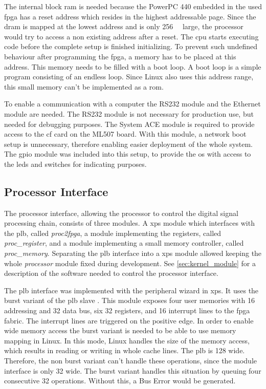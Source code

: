 \documentclass[12pt,a4paper,parskip=full,abstract=true,BCOR=12mm,twoside,open=right]{scrreprt}
\def\device#1{\mbox{\textit{#1}}}
\begin{document}
The internal block \gls{ram} is needed because the PowerPC 440 embedded
in the used \gls{fpga} has a reset address which resides in the highest
addressable page\cite{ppc}. Since the \gls{dram} is mapped at the lowest address
and is only \SI{256}{\mebi\byte} large\cite{ml507}, the processor would try to access
a non existing address after a reset. The \gls{cpu} starts
executing code before the complete setup is finished initializing. To prevent such undefined
behaviour after programming the \gls{fpga}, a memory has to be placed at
this address. This memory needs to be filled with a boot loop. A boot
loop is a simple program consisting of an endless loop. Since Linux
also uses this address range, this small memory can't be implemented
as a \gls{rom}.

To enable a communication with a computer the RS232 module and the Ethernet
module are needed. The RS232 module is not necessary for production use,
but needed for debugging purposes. The System ACE module is required to
provide access to the \gls{cf} card on the ML507 board. With this module,
a network boot setup is unnecessary, therefore enabling easier deployment
of the whole system. The \gls{gpio} module was included into this setup,
to provide the \gls{os} with access to the \glspl{led} and switches for
indicating purposes.


\subsection{Processor Interface}
\label{sec:processor_interface}

The processor interface, allowing the processor to control the digital
signal processing chain, consists of three modules. A \gls{xps} module which
interfaces with the \gls{plb}, called \device{proc2fpga}, a module
implementing the registers, called \device{proc\_register}, and a module
implementing a small memory controller, called \device{proc\_memory}. Separating
the \gls{plb} interface into a \gls{xps} module allowed keeping the whole
\device{processor} module fixed during development. See \cref{sec:kernel_module}
for a description of the software needed to control the processor interface.

The \gls{plb} interface was implemented with the peripheral wizard in \gls{xps}.
It uses the burst variant of the \gls{plb} slave \cite{slave_burst}. This module
exposes four user memories with \SI{16}{\bit} addressing and \SI{32}{\bit} data
bus, six \SI{32}{\bit} registers, and 16 interrupt lines to the \gls{fpga} fabric.
The interrupt lines are triggered on the positive edge. In order to enable wide
memory access the burst variant is needed to be able to use memory mapping in
Linux. In this mode, Linux handles the
size of the memory access, which results in reading or writing in whole
cache lines. The \gls{plb} is \SI{128}{\bit} wide. Therefore, the non burst variant
can't handle these operations, since the module interface is only \SI{32}{\bit}
wide. The burst variant handles this situation by queuing four consecutive
\SI{32}{\bit} operations. Without this, a Bus Error would be generated.
\end{document}
